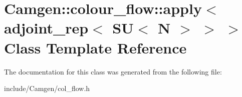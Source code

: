 \hypertarget{a00015}{\section{Camgen\-:\-:colour\-\_\-flow\-:\-:apply$<$ adjoint\-\_\-rep$<$ S\-U$<$ N $>$ $>$ $>$ Class Template Reference}
\label{a00015}
}


The documentation for this class was generated from the following file\-:\begin{DoxyCompactItemize}
\item 
include/\-Camgen/col\-\_\-flow.\-h\end{DoxyCompactItemize}
